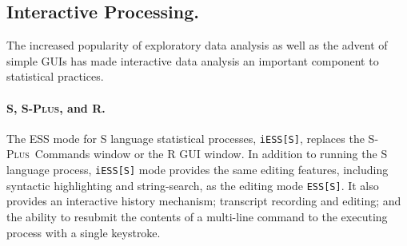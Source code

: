 \documentclass{article}
\newcommand*{\Splus}{\textsc{S-Plus}}
\newcommand{\stexttt}[1]{{\small\texttt{#1}}}
\begin{document}
\subsection{Interactive Processing.}
\label{sec:interactive}

The increased popularity of exploratory data analysis as well as the
advent of simple GUIs has made interactive data analysis an important
component to statistical practices.  

\paragraph{S, \Splus, and R.}
The ESS mode for S language statistical processes, \stexttt{iESS[S]},
replaces the \Splus\ Commands window or the R GUI window.  In addition
to running the S language process, \stexttt{iESS[S]} mode provides the
same editing features, including syntactic highlighting and
string-search, as the editing mode \stexttt{ESS[S]}.  It also provides
an interactive history mechanism; transcript recording and editing;
and the ability to resubmit the contents of a multi-line command to
the executing process with a single keystroke.
\end{document}
